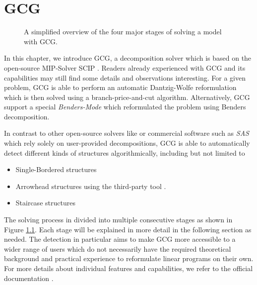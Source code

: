 \chapter{GCG}

	\begin{figure}[ht!]
		\centering
		
		\caption{A simplified overview of the four major stages of solving a model with \acs{GCG}.}
		\label{fig:gcg:overview}
	\end{figure}

	In this chapter, we introduce \acf{GCG}, a decomposition solver which is based on the open-source MIP-Solver \ac{SCIP} \cite{gamrathExperimentsGenericDantzigWolfe2010}.
	Readers already experienced with GCG and its capabilities may still find some details and observations interesting.
	For a given problem, \acs{GCG} is able to perform an automatic Dantzig-Wolfe reformulation which is then solved using a branch-price-and-cut algorithm.
	Alternatively, \ac{GCG} support a special \textit{Benders-Mode} which reformulated the problem using Benders decomposition.
	
	In contrast to other open-source solvers like  \cite{sadykovBaPCodGenericBranchandprice2021} or commercial software such as \textit{SAS} \cite{SASDataAI} which rely solely on user-provided decompositions, \ac{GCG} is able to automatically detect different kinds of structures algorithmically, including but not limited to
	\begin{itemize}
		\item Single-Bordered structures
		\item Arrowhead structures using the third-party tool  \cite{karypisMultilevelHypergraphPartitioning1997}.
		\item Staircase structures
	\end{itemize}
	
	The solving process in divided into multiple consecutive stages as shown in Figure \ref{fig:gcg:overview}. Each stage will be explained in more detail in the following section as needed.
	The detection in particular aims to make \ac{GCG} more accessible to a wider range of users which do not necessarily have the required theoretical background and practical experience to reformulate linear programs on their own.
	For more details about individual features and capabilities, we refer to the official documentation \cite{GCG}. 

